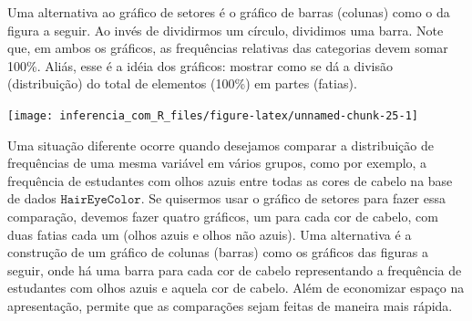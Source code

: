 \documentclass[
]{book}
\newenvironment{Shaded}{\begin{snugshade}}{\end{snugshade}}
\newcommand{\AttributeTok}[1]{\textcolor[rgb]{0.77,0.63,0.00}{#1}}
\newcommand{\FloatTok}[1]{\textcolor[rgb]{0.00,0.00,0.81}{#1}}
\newcommand{\FunctionTok}[1]{\textcolor[rgb]{0.00,0.00,0.00}{#1}}
\newcommand{\NormalTok}[1]{#1}
\newcommand{\OtherTok}[1]{\textcolor[rgb]{0.56,0.35,0.01}{#1}}
\newcommand{\SpecialCharTok}[1]{\textcolor[rgb]{0.00,0.00,0.00}{#1}}
\newcommand{\StringTok}[1]{\textcolor[rgb]{0.31,0.60,0.02}{#1}}
\begin{document}
Uma alternativa ao gráfico de setores é o gráfico de barras (colunas) como o da figura a seguir. Ao invés de dividirmos um círculo, dividimos uma barra. Note que, em ambos os gráficos, as frequências relativas das categorias devem somar 100\%. Aliás, esse é a idéia dos gráficos: mostrar como se dá a divisão (distribuição) do total de elementos (100\%) em partes (fatias).

\begin{Shaded}
\end{Shaded}

\begin{center}\texttt{[image: inferencia\_com\_R\_files/figure-latex/unnamed-chunk-25-1]} \end{center}

Uma situação diferente ocorre quando desejamos comparar a distribuição de frequências de uma mesma variável em vários grupos, como por exemplo, a frequência de estudantes com olhos azuis entre todas as cores de cabelo na base de dados \(\texttt{HairEyeColor}\). Se quisermos usar o gráfico de setores para fazer essa comparação, devemos fazer quatro gráficos, um para cada cor de cabelo, com duas fatias cada um (olhos azuis e olhos não azuis). Uma alternativa é a construção de um gráfico de colunas (barras) como os gráficos das figuras a seguir, onde há uma barra para cada cor de cabelo representando a frequência de estudantes com olhos azuis e aquela cor de cabelo. Além de economizar espaço na apresentação, permite que as comparações sejam feitas de maneira mais rápida.
\end{document}
